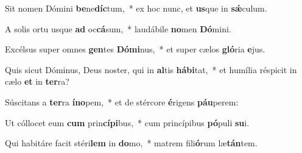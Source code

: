 \item Sit nomen Dómini \textbf{be}ne\textbf{díc}tum,~* ex hoc nunc, et \textbf{us}que in \textbf{sǽ}culum.
\item A solis ortu usque \textbf{ad} oc\textbf{cá}sum,~* laudábile \textbf{no}men \textbf{Dó}mini.
\item Excélsus super omnes \textbf{gen}tes \textbf{Dó}\textbf{mi}nus,~* et super cælos \textbf{gló}ria \textbf{e}jus.
\item Quis sicut Dóminus, Deus noster, qui in \textbf{al}tis \textbf{há}\textbf{bi}tat,~* et humília réspicit in cælo \textbf{et} in \textbf{ter}ra?
\item Súscitans a \textbf{ter}ra \textbf{ín}\textbf{o}pem,~* et de stércore \textbf{é}rigens \textbf{páu}perem:
\item Ut cóllocet eum \textbf{cum} prin\textbf{cí}\textbf{pi}bus,~* cum princípibus \textbf{pó}puli \textbf{su}i.
\item Qui habitáre facit stéri\textbf{lem} in \textbf{do}mo,~* matrem fili\textbf{ó}rum læ\textbf{tán}tem.
